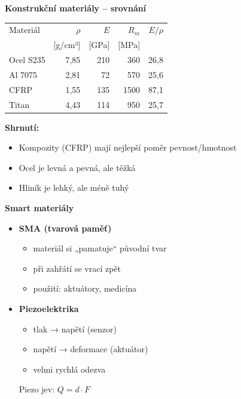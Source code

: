 \documentclass[a4paper,10pt]{article}
\begin{document}
\begin{vysvetlenibox}

\textbf{Konstrukční materiály -- srovnání}

\begin{center}
\begin{tabular}{l r r r r}
Materiál & $\rho$ & $E$ & $R_m$ & $E/\rho$ \\
 & [g/cm³] & [GPa] & [MPa] & \\
\hline
Ocel S235 & 7,85 & 210 & 360 & 26,8 \\
Al 7075   & 2,81 & 72  & 570 & 25,6 \\
CFRP      & 1,55 & 135 & 1500 & 87,1 \\
Titan     & 4,43 & 114 & 950 & 25,7 \\
\end{tabular}
\end{center}

\textbf{Shrnutí:}
\begin{itemize}
\item Kompozity (CFRP) mají nejlepší poměr pevnost/hmotnost
\item Ocel je levná a pevná, ale těžká
\item Hliník je lehký, ale méně tuhý
\end{itemize}

\textbf{Smart materiály}

\begin{itemize}
\item \textbf{SMA (tvarová paměť)}
    \begin{itemize}
    \item materiál si „pamatuje“ původní tvar
    \item při zahřátí se vrací zpět
    \item použití: aktuátory, medicína
    \end{itemize}

\item \textbf{Piezoelektrika}
    \begin{itemize}
    \item tlak → napětí (senzor)
    \item napětí → deformace (aktuátor)
    \item velmi rychlá odezva
    \end{itemize}

\begin{vzorcebox}
Piezo jev: $Q = d \cdot F$
\end{vzorcebox}


\end{itemize}
\end{vysvetlenibox}
\end{document}
